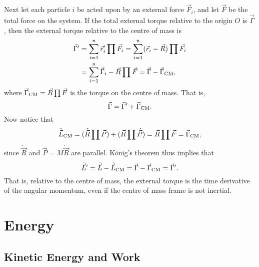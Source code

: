 \documentclass[article, a4paper, 11pt, oneside]{memoir}
\numberwithin{equation}{chapter}
\begin{document}
\begin{remarkbreak}
    Next let each particle $i$ be acted upon by an external force $\vec{F}_i$, and let $\vec{F}$ be the total force on the system. If the total external torque relative to the origin $O$ is $\vec{\Gamma}$, then the external torque relative to the centre of mass is
    \begin{align*}
        \vec{\Gamma}'
            &= \sum_{i=1}^n \vec{r}_i' \prod \vec{F}_i
             = \sum_{i=1}^n (\vec{r}_i - \vec{R}) \prod \vec{F}_i \\
            &= \sum_{i=1}^n \vec{\Gamma}_i - \vec{R} \prod \vec{F}
             = \vec{\Gamma} - \vec{\Gamma}_{\mathrm{CM}},
    \end{align*}
    where $\vec{\Gamma}_{\mathrm{CM}} = \vec{R} \prod \vec{F}$ is the torque on the centre of mass. That is,
    \begin{equation*}
        \vec{\Gamma}
            = \vec{\Gamma}' + \vec{\Gamma}_{\mathrm{CM}}.
    \end{equation*}
    Now notice that 
    \begin{equation*}
        \dot{\vec{L}}_{\mathrm{CM}}
            = (\dot{\vec{R}} \prod \vec{P}) + (\vec{R} \prod \dot{\vec{P}})
            = \vec{R} \prod \vec{F}
            = \vec{\Gamma}_{\mathrm{CM}},
    \end{equation*}
    since $\dot{\vec{R}}$ and $\vec{P} = M\dot{\vec{R}}$ are parallel. König's theorem thus implies that
    \begin{equation*}
        \dot{\vec{L}}'
            = \dot{\vec{L}} - \dot{\vec{L}}_{\mathrm{CM}}
            = \vec{\Gamma} - \vec{\Gamma}_{\mathrm{CM}}
            = \vec{\Gamma}'.
    \end{equation*}
    That is, relative to the centre of mass, the external torque is the time derivative of the angular momentum, even if the centre of mass frame is not inertial.
\end{remarkbreak}


\chapter{Energy}

\section{Kinetic Energy and Work}
\end{document}

